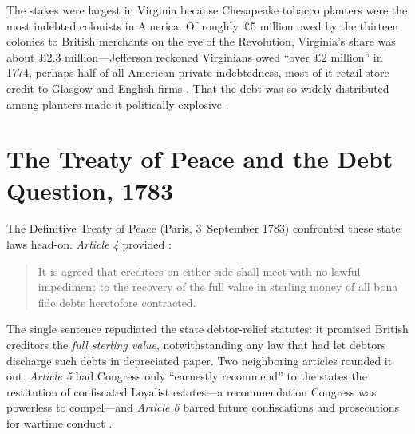 \documentclass[12pt]{article}
\begin{document}
The stakes were largest in Virginia because Chesapeake tobacco planters were the
most indebted colonists in America. Of roughly \pounds5 million owed by the
thirteen colonies to British merchants on the eve of the Revolution, Virginia's
share was about \pounds2.3 million---Jefferson reckoned Virginians owed ``over
\pounds2 million'' in 1774, perhaps half of all American private
indebtedness, most of it retail store credit to Glasgow and English firms
\citep{adamson2003british, evans1962planter, evans1971private}. That the debt was
so widely distributed among planters made it politically explosive
\citep{holton1999forced, sloan1995principle}.

\section{The Treaty of Peace and the Debt Question, 1783}
\label{sec:treaty}

The Definitive Treaty of Peace (Paris, 3~September 1783) confronted these state
laws head-on. \emph{Article 4} provided \citep{treatyparis1783}:
\begin{quote}
It is agreed that creditors on either side shall meet with no lawful impediment to
the recovery of the full value in sterling money of all bona fide debts heretofore
contracted.
\end{quote}
The single sentence repudiated the state debtor-relief statutes: it promised
British creditors the \emph{full sterling value}, notwithstanding any law that had
let debtors discharge such debts in depreciated paper. Two neighboring articles
rounded it out. \emph{Article 5} had Congress only ``earnestly recommend'' to the
states the restitution of confiscated Loyalist estates---a recommendation Congress
was powerless to compel---and \emph{Article 6} barred future confiscations and
prosecutions for wartime conduct \citep{treatyparis1783}.
\end{document}
